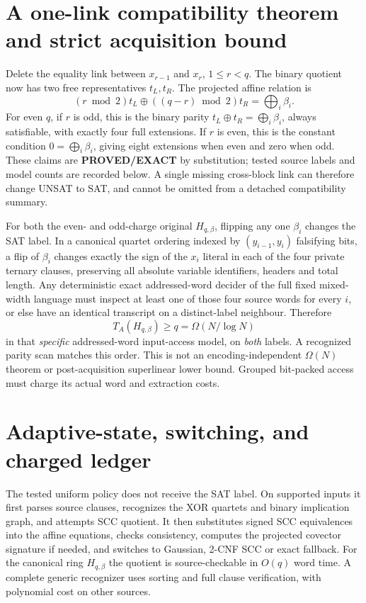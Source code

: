 \documentclass[11pt]{article}
\newcommand{\PROVED}{\textbf{PROVED/EXACT}}
\begin{document}
\section{A one-link compatibility theorem and strict acquisition bound}
Delete the equality link between $x_{r-1}$ and $x_r$,
$1\le r<q$. The binary quotient now has two free representatives
$t_L,t_R$. The projected affine relation is
\[
(r\bmod2)t_L\oplus((q-r)\bmod2)t_R
=\bigoplus_i\beta_i. \tag{8}
\]
For even $q$, if $r$ is odd, this is the binary parity
$t_L\oplus t_R=\bigoplus_i\beta_i$, always satisfiable,
with exactly four full extensions. If $r$ is even, this
is the constant condition $0=\bigoplus_i\beta_i$, giving
eight extensions when even and zero when odd. These claims
are \PROVED{} by substitution; tested source labels and model
counts are recorded below. A single missing cross-block link
can therefore change UNSAT to SAT, and cannot be omitted from
a detached compatibility summary.

For both the even- and odd-charge original $H_{q,\beta}$,
flipping any one $\beta_i$ changes the SAT label. In a canonical
quartet ordering indexed by $(y_{i-1},y_i)$ falsifying bits,
a flip of $\beta_i$ changes exactly the sign of the $x_i$
literal in each of the four private ternary clauses, preserving
all absolute variable identifiers, headers and total length.
Any deterministic exact addressed-word decider of the full
fixed mixed-width language must inspect at least one of those
four source words for every $i$, or else have an identical
transcript on a distinct-label neighbour. Therefore
\[
T_A(H_{q,\beta})\ge q
=\Omega(N/\log N) \tag{9}
\]
in that \emph{specific} addressed-word input-access model,
on \emph{both} labels. A recognized parity scan matches this
order. This is not an encoding-independent $\Omega(N)$ theorem
or post-acquisition superlinear lower bound. Grouped bit-packed
access must charge its actual word and extraction costs.

\section{Adaptive-state, switching, and charged ledger}
The tested uniform policy does not receive the SAT label.
On supported inputs it first parses source clauses, recognizes
the XOR quartets and binary implication graph, and attempts
SCC quotient. It then substitutes signed SCC equivalences
into the affine equations, checks consistency, computes
the projected covector signature if needed, and switches
to Gaussian, 2-CNF SCC or exact fallback. For the canonical
ring $H_{q,\beta}$ the quotient is source-checkable in $O(q)$
word time. A complete generic recognizer uses sorting and
full clause verification, with polynomial cost on other sources.
\end{document}
